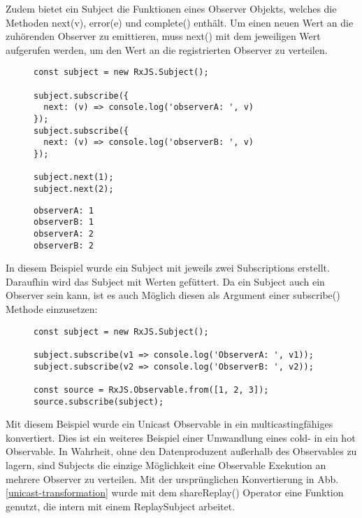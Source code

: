 \noindent
Zudem bietet ein Subject die Funktionen eines Observer Objekts, welches die Methoden next(v), error(e) und complete() enthält. Um einen neuen Wert an die zuhörenden Observer zu emittieren, muss next() mit dem jeweiligen Wert aufgerufen werden, um den Wert an die registrierten Observer zu verteilen.

\begin{figure}[H]
\begin{lstlisting}[basicstyle=\small]
const subject = new RxJS.Subject();

subject.subscribe({
  next: (v) => console.log('observerA: ', v)
});
subject.subscribe({
  next: (v) => console.log('observerB: ', v)
});

subject.next(1);
subject.next(2);
\end{lstlisting}
\end{figure}

\begin{figure}[H]
\begin{lstlisting}
observerA: 1
observerB: 1
observerA: 2
observerB: 2
\end{lstlisting}
\end{figure}

\noindent
In diesem Beispiel wurde ein Subject mit jeweils zwei Subscriptions erstellt. Daraufhin wird das Subject mit Werten \glqq gefüttert\grqq. Da ein Subject auch ein Observer sein kann, ist es auch Möglich diesen als Argument einer subscribe() Methode einzusetzen:

\begin{figure}[H]
\begin{lstlisting}[basicstyle=\small]
const subject = new RxJS.Subject();

subject.subscribe(v1 => console.log('ObserverA: ', v1));
subject.subscribe(v2 => console.log('ObserverB: ', v2));

const source = RxJS.Observable.from([1, 2, 3]);
source.subscribe(subject);
\end{lstlisting}
\end{figure}


\noindent
Mit diesem Beispiel wurde ein Unicast Observable in ein multicastingfähiges konvertiert. Dies ist ein weiteres Beispiel einer Umwandlung eines cold- in ein hot Observable. In Wahrheit, ohne den Datenproduzent außerhalb des Observables zu lagern, sind Subjects die einzige Möglichkeit eine Observable Exekution an mehrere Observer zu verteilen. Mit der ursprünglichen Konvertierung in Abb. \ref{unicast-transformation} wurde mit dem shareReplay() Operator eine Funktion genutzt, die intern mit einem ReplaySubject arbeitet.\\

